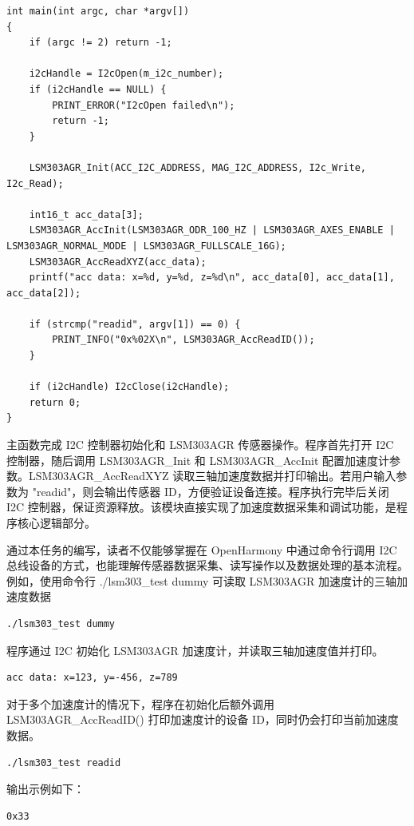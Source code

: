 \begin{lstlisting}
int main(int argc, char *argv[])
{
    if (argc != 2) return -1;

    i2cHandle = I2cOpen(m_i2c_number);
    if (i2cHandle == NULL) {
        PRINT_ERROR("I2cOpen failed\n");
        return -1;
    }

    LSM303AGR_Init(ACC_I2C_ADDRESS, MAG_I2C_ADDRESS, I2c_Write, I2c_Read);

    int16_t acc_data[3];
    LSM303AGR_AccInit(LSM303AGR_ODR_100_HZ | LSM303AGR_AXES_ENABLE | LSM303AGR_NORMAL_MODE | LSM303AGR_FULLSCALE_16G);
    LSM303AGR_AccReadXYZ(acc_data);
    printf("acc data: x=%d, y=%d, z=%d\n", acc_data[0], acc_data[1], acc_data[2]);

    if (strcmp("readid", argv[1]) == 0) {
        PRINT_INFO("0x%02X\n", LSM303AGR_AccReadID());
    }

    if (i2cHandle) I2cClose(i2cHandle);
    return 0;
}
\end{lstlisting}

主函数完成 I2C 控制器初始化和 LSM303AGR 传感器操作。程序首先打开 I2C 控制器，随后调用 LSM303AGR_Init 和 LSM303AGR_AccInit 配置加速度计参数。LSM303AGR_AccReadXYZ 读取三轴加速度数据并打印输出。若用户输入参数为 "readid"，则会输出传感器 ID，方便验证设备连接。程序执行完毕后关闭 I2C 控制器，保证资源释放。该模块直接实现了加速度数据采集和调试功能，是程序核心逻辑部分。


通过本任务的编写，读者不仅能够掌握在 OpenHarmony 中通过命令行调用 I2C 总线设备的方式，也能理解传感器数据采集、读写操作以及数据处理的基本流程。例如，使用命令行 ./lsm303_test dummy 可读取 LSM303AGR 加速度计的三轴加速度数据
\begin{lstlisting}[numbers=none]
./lsm303_test dummy
\end{lstlisting}

程序通过 I2C 初始化 LSM303AGR 加速度计，并读取三轴加速度值并打印。
\begin{lstlisting}[numbers=none]
acc data: x=123, y=-456, z=789
\end{lstlisting}

对于多个加速度计的情况下，程序在初始化后额外调用 LSM303AGR_AccReadID() 打印加速度计的设备 ID，同时仍会打印当前加速度数据。
\begin{lstlisting}[numbers=none]
./lsm303_test readid
\end{lstlisting}

输出示例如下：
\begin{lstlisting}[numbers=none]
0x33
\end{lstlisting}

